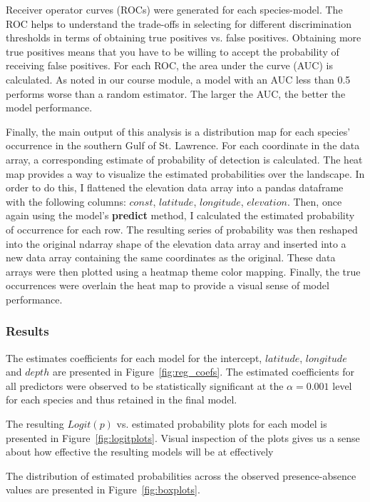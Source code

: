 Receiver operator curves (ROCs) were generated for each species-model.
The ROC helps to understand the trade-offs in selecting for different discrimination thresholds in terms of obtaining true positives vs.
false positives.
Obtaining more true positives means that you have to be willing to accept the probability of receiving false positives.
For each ROC, the area under the curve (AUC) is calculated.
As noted in our course module, a model with an AUC less than 0.5 performs worse than a random estimator.
The larger the AUC, the better the model performance.

Finally, the main output of this analysis is a distribution map for each species' occurrence in the southern Gulf of St. Lawrence.
For each coordinate in the data array, a corresponding estimate of probability of detection is calculated.
The heat map provides a way to visualize the estimated probabilities over the landscape.
In order to do this, I flattened the elevation data array into a pandas dataframe with the following columns: $const$, $latitude$, $longitude$, $elevation$.
Then, once again using the model's \textbf{predict} method, I calculated the estimated probability of occurrence for each row.
The resulting series of probability was then reshaped into the original ndarray shape of the elevation data array and inserted into a
new data array containing the same coordinates as the original.
These data arrays were then plotted using a heatmap theme color mapping.
Finally, the true occurrences were overlain the heat map to provide a visual sense of model performance.


\subsubsection{Results}

The estimates coefficients for each model for the intercept, $latitude$, $longitude$ and $depth$ are presented in Figure~\ref{fig:reg_coefs}.
The estimated coefficients for all predictors were observed to be statistically significant at the $\alpha=0.001$ level for each species
and thus retained in the final model.

The resulting $Logit(p)$ vs. estimated probability plots for each model is presented in Figure~\ref{fig:logitplots}.
Visual inspection of the plots gives us a sense about how effective the resulting models will be at effectively

The distribution of estimated probabilities across the observed presence-absence values are presented in Figure~\ref{fig:boxplots}.

